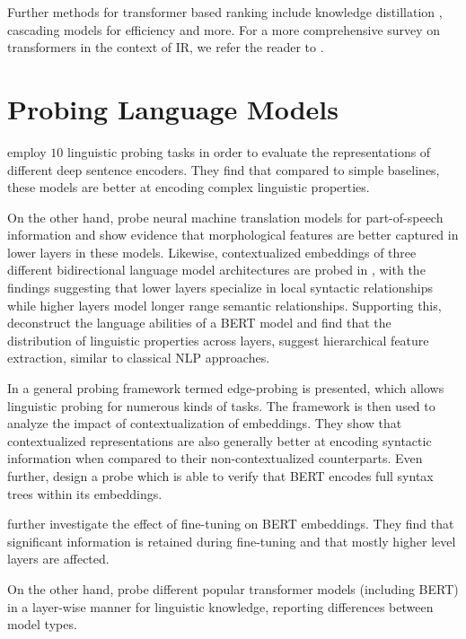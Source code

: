 Further methods for transformer based ranking include knowledge distillation \cite{DBLP:journals/corr/abs-2009-07531, DBLP:journals/corr/abs-2010-02666}, cascading models for efficiency \cite{Nogueira2019MultiStageDR} and more. For a more comprehensive survey on transformers in the context of IR, we refer the reader to \cite{10.1145/3437963.3441667}.

\section{Probing Language Models}
\cite{conneau-etal-2018-cram} employ $10$ linguistic probing tasks in order to evaluate the representations of different deep sentence encoders. They find that compared to simple baselines, these models are better at encoding complex linguistic properties.

On the other hand, \cite{Belinkov2017WhatDN} probe neural machine translation models for part-of-speech information and show evidence that morphological features are better captured in lower layers in these models. Likewise, contextualized embeddings of three different bidirectional language model architectures are probed in \cite{peters-etal-2018-dissecting}, with the findings suggesting that lower layers specialize in local syntactic relationships while higher layers model longer range semantic relationships. Supporting this, \cite{tenney-etal-2019-bert} deconstruct the language abilities of a BERT model and find that the distribution of linguistic properties across layers, suggest hierarchical feature extraction, similar to classical NLP approaches.

In \cite{Tenney2019WhatDY} a general probing framework termed edge-probing is presented, which allows linguistic probing for numerous kinds of tasks. The framework is then used to analyze the impact of contextualization of embeddings. They show that contextualized representations are also generally better at encoding syntactic information when compared to their non-contextualized counterparts. Even further, \cite{Hewitt2019ASP} design a probe which is able to verify that BERT encodes full syntax trees within its embeddings.

\cite{merchant-etal-2020-happens} further investigate the effect of fine-tuning on BERT embeddings. They find that significant information is retained during fine-tuning and that mostly higher level layers are affected.

On the other hand, \cite{Fayyaz2021NotAM} probe different popular transformer models (including BERT) in a layer-wise manner for linguistic knowledge, reporting differences between model types.

